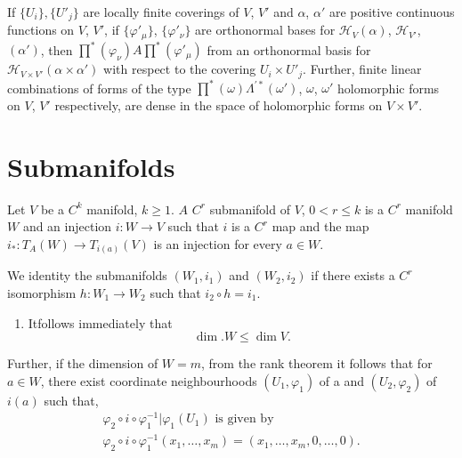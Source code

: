 \begin{proposition}\label{chap2:sec2:prop2} %
  If $\{ U_i \}, \{ U'_j\}$ are locally finite coverings of $V$, $V'$
  and $\alpha$, $\alpha'$ are positive continuous functions on $V$,
  $V'$, if $\{ \varphi'_\mu\}$, $\{ \varphi'_\nu\}$ are orthonormal
  bases for $\mathscr{H}_V (\alpha)$, $\mathscr{H}_{V'}$, $(\alpha')$,
  then $\prod^* (\varphi_\nu) A \prod^* (\varphi'_\mu)$ from an
  orthonormal basis for $\mathscr{H}_{V \times V'}(\alpha \times
  \alpha')$ with respect to the covering $U_i \times  U'_j$. Further,
  finite linear combinations of forms of the type $\prod^* (\omega )
  \Lambda^{' *}(\omega')$, $\omega$, $\omega'$ holomorphic forms on
  $V$, $V'$ respectively, are dense in the space of holomorphic forms
  on $V \times V'$. 
\end{proposition}

\section{Submanifolds}\label{chap2:sec3} %

\begin{defi*}
  Let $V$ be a $C^k$ manifold, $k \ge 1$. $A$ $C^r$ submanifold of
  $V$, $0 < r \le k$ is a $C^r$ manifold $W$ and an injection $i: W
  \to V$ such that $i$ is a $C^r$ map and the map $i_*: T_A (W) \to
  T_{i (a)}(V)$ is an injection for every $a \in W$. 
\end{defi*}

We identity the submanifolds $(W_1, i_1)$ and $(W_2, i_2)$ if there
exists a $C^r$ isomorphism $h: W_1 \to W_2$ such that  $i_2 \circ h =
i_1$. 
\begin{remarks*} 
  \begin{enumerate}[1]
  \item It\pageoriginale follows immediately that 
    $$
    \dim. W \leq \dim V.
    $$
  \end{enumerate}
\end{remarks*}

Further, if the dimension of  $W = m$, from  the rank theorem it
follows that for $a \in W$, there exist coordinate neighbourhoods
$(U_1,  \varphi_1)$ of a and $(U_2, \varphi_2)$ of $i(a)$ such that, 
\begin{gather*}
  \varphi_2 \circ i \circ \varphi^{-1}_1 | \varphi_1 (U_1) \text{ is given by }\\
  \varphi_2 \circ i \circ  \varphi^{-1}_1 (x_1, \ldots , x_m) = (x_1, \ldots ,
  x_m , 0, \ldots , 0). 
\end{gather*}

